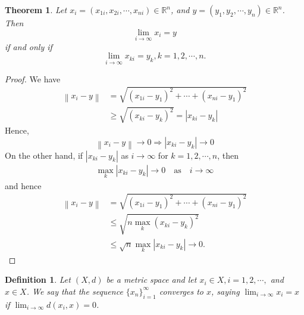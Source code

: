 \documentclass[12pt,leqno]{amsart}
\newtheorem{theorem}{Theorem}[section]
\newtheorem{definition}{Definition}[section]
\theoremstyle{definition}
\begin{document}
\begin{theorem}
Let $x_i = (x_{1i}, x_{2i}, \cdots, x_{ni}) \in \mathbb{R}^n$, and $y = (y_{1}, y_{2}, \cdots, y_{n}) \in \mathbb{R}^n$. Then 
$$\lim_{i\to\infty}x_i = y$$ if and only if $$\lim_{i\to\infty}x_{ki} = y_k,k = 1,2,\cdots,n.$$
\end{theorem}
\begin{proof}
We have 
\begin{align*}
    \left\|x_i - y\right\| & = \sqrt{(x_{1i}-y_1)^2 + \cdots + (x_{ni}-y_1)^2} \\
    & \geq \sqrt{(x_{ki}-y_k)^2} = |x_{ki} - y_k|
\end{align*}
Hence, $$\left\|x_i - y\right\| \to 0 \Rightarrow |x_{ki} - y_k| \to 0$$
On the other hand, if $|x_{ki} - y_k|$ as $i\to\infty$ for $k = 1,2,\cdots, n$, then 
\begin{align*}
    \max_k |x_{ki} - y_k| \to 0 \quad \text{as}\quad i\to\infty
\end{align*}
and hence
\begin{align*}
    \left\|x_i - y\right\| & = \sqrt{(x_{1i}-y_1)^2 + \cdots + (x_{ni}-y_1)^2} \\
    & \leq \sqrt{n \max_k (x_{ki}-y_k)^2} \\
    & \leq \sqrt{n} \max_k |x_{ki} - y_k| \to 0.
\end{align*}
\end{proof}

\begin{definition}
Let $(X,d)$ be a metric space and let $x_i\in X, i = 1,2,\cdots,$ and $x\in X$. We say that the sequence $\{x_n\}^\infty_{i=1}$ converges to $x$, saying
$\lim_{i\to\infty}x_i = x$ if $\lim_{i\to\infty}d(x_i, x) = 0$.
\end{definition}\\
\end{document}
